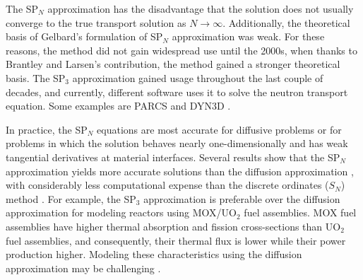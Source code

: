 \documentclass{anstrans}
\begin{document}
The SP$_N$ approximation has the disadvantage that the solution does not usually converge to the true transport solution as $N \rightarrow \infty$.
Additionally, the theoretical basis of Gelbard's formulation of SP$_N$ approximation was weak.
For these reasons, the method did not gain widespread use until the 2000s, when thanks to Brantley and Larsen's \cite{brantley_simplifiedP3_2000} contribution, the method gained a stronger theoretical basis.
The SP$_3$ approximation gained usage throughout the last couple of decades, and currently, different software uses it to solve the neutron transport equation.
Some examples are PARCS \cite{downar_parcs_2004} and DYN3D \cite{beckert_development_2007}.

In practice, the SP$_N$ equations are most accurate for diffusive problems or for problems in which the solution behaves nearly one-dimensionally and has weak tangential derivatives at material interfaces.
Several results show that the SP$_N$ approximation yields more accurate solutions than the diffusion approximation \cite{mui_modified_1987} \cite{beckert_development_2007} \cite{ryu_finite_2013}, with considerably less computational expense than the discrete ordinates ($S_N$) method \cite{brantley_simplifiedP3_2000}.
For example, the SP$_3$ approximation is preferable over the diffusion approximation for modeling reactors using MOX/UO$_2$ fuel assemblies.
MOX fuel assemblies have higher thermal absorption and fission cross-sections than UO$_2$ fuel assemblies, and consequently, their thermal flux is lower while their power production higher.
Modeling these characteristics using the diffusion approximation may be challenging \cite{brantley_simplifiedP3_2000} \cite{capilla_applications_2009}.
\end{document}
